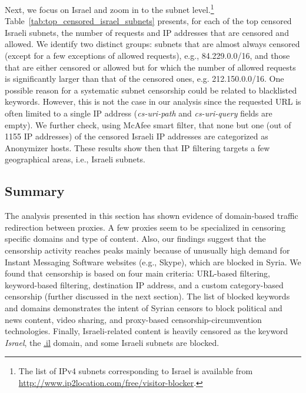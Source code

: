 \documentclass{sig-alternate-2013}
\begin{document}
Next, we focus on Israel and zoom in to the subnet level.\footnote{The list of IPv4 subnets corresponding to Israel is available from \url{http://www.ip2location.com/free/visitor-blocker}.} Table~\ref{tab:top_censored_israel_subnets} presents, for each of the top censored Israeli subnets, the number of requests and IP addresses that are censored and allowed. We identify two distinct groups: subnets that are almost always censored (except for a few exceptions of allowed requests), e.g., 84.229.0.0/16, and those that are either censored or allowed but for which the number of allowed requests is significantly larger than that of the censored ones, e.g. 212.150.0.0/16. 
One possible reason for a systematic subnet censorship could be related to blacklisted keywords. However, this is not the case in our analysis since the requested URL is often limited to  a single IP address (\emph{cs-uri-path} and \emph{cs-uri-query} fields are empty). We further check, using McAfee smart filter, that none but one (out of 1155 IP addresses) of 
the censored Israeli IP addresses are categorized as Anonymizer hosts. These results show then that IP filtering targets a few geographical areas, i.e., Israeli subnets.  



\subsection{Summary}
The analysis presented in this section has shown evidence of domain-based traffic redirection between proxies. A few proxies seem to be specialized in censoring specific domains and type of content.  Also, our findings suggest that the censorship activity reaches peaks mainly because of unusually high demand for Instant Messaging Software websites (e.g., Skype), which are blocked in Syria. 
We found that censorship is based on four main criteria: URL-based filtering, keyword-based filtering, destination IP address, and a custom category-based censorship (further discussed in the next section). 
The list of blocked keywords and domains demonstrates the intent of Syrian censors to block political and news content, video sharing, and proxy-based censorship-circumvention technologies. Finally, Israeli-related content is heavily censored as the keyword \emph{Israel}, the \url{.il} domain, and some Israeli subnets are blocked. 


 
\end{document}
